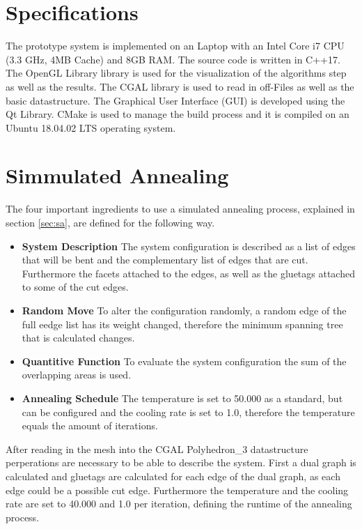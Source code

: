 \documentclass[draft,final]{vutinfth} %
\begin{document}
\section{Specifications}

The prototype system is implemented on an Laptop with an Intel Core i7 CPU (3.3 GHz, 4MB Cache) and 8GB RAM. The source code is written in C++17. The OpenGL Library library is used for the visualization of the algorithms step as well as the results. The CGAL library is used to read in off-Files as well as the basic datastructure. The Graphical User Interface (GUI) is developed using the Qt Library. CMake is used to manage the build process and it is compiled on an Ubuntu 18.04.02 LTS operating system.

\section{Simmulated Annealing}

The four important ingredients to use a simulated annealing process, explained in section \ref{sec:sa}, are defined for the following way.
\begin{itemize}
	\item \textbf{System Description} The system configuration is described as a list of edges that will be bent and the complementary list of edges that are cut. Furthermore the facets attached to the edges, as well as the gluetags attached to some of the cut edges.
	\item \textbf{Random Move} To alter the configuration randomly, a random edge of the full eedge list has its weight changed, therefore the minimum spanning tree that is calculated changes.
	\item \textbf{Quantitive Function} To evaluate the system configuration the sum of the overlapping areas is used.
	\item \textbf{Annealing Schedule} The temperature is set to 50.000 as a standard, but can be configured and the cooling rate is set to 1.0, therefore the temperature equals the amount of iterations.
\end{itemize}

After reading in the mesh into the CGAL Polyhedron\_3 datastructure perperations are necessary to be able to describe the system. First a dual graph is calculated and gluetags are calculated for each edge of the dual graph, as each edge could be a possible cut edge. Furthermore the temperature and the cooling rate are set to 40.000 and 1.0 per iteration, defining the runtime of the annealing process.
\end{document}
